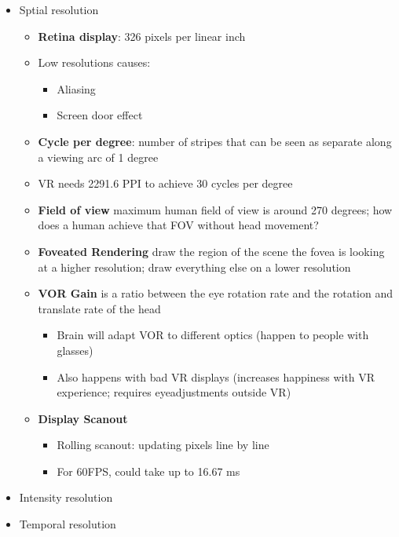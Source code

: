   \begin{itemize}
    \item Sptial resolution
    \begin{itemize}
      \item \textbf{Retina display}: 326 pixels per linear inch
      \item Low resolutions causes:
      \begin{itemize}
        \item Aliasing
        \item Screen door effect
      \end{itemize}

      \item \textbf{Cycle per degree}: number of stripes that can be seen
      as separate along a viewing arc of 1 degree
      \item VR needs 2291.6 PPI to achieve 30 cycles per degree
      \item \textbf{Field of view} maximum human field of view is around
      270 degrees; how does a human achieve that FOV without head movement?
      \item \textbf{Foveated Rendering} draw the region of the scene the fovea
      is looking at a higher resolution; draw everything else on a lower
      resolution
      \item \textbf{VOR Gain} is a ratio between the eye rotation rate and
      the rotation and translate rate of the head
      \begin{itemize}
        \item Brain will adapt VOR to different optics (happen to people with
        glasses)
        \item Also happens with bad VR displays (increases happiness with VR
        experience; requires eyeadjustments outside VR)
      \end{itemize}

      \item \textbf{Display Scanout}
      \begin{itemize}
        \item Rolling scanout: updating pixels line by line
        \item For 60FPS, could take up to 16.67 ms
      \end{itemize}

    \end{itemize}
    \item Intensity resolution
    \item Temporal resolution
  \end{itemize}
